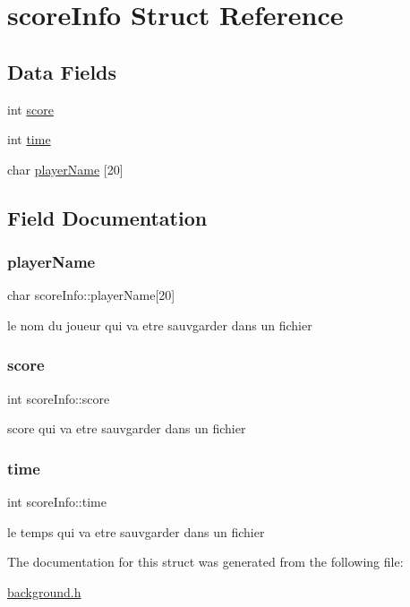 \hypertarget{structscoreInfo}{}\section{score\+Info Struct Reference}
\label{structscoreInfo}
\subsection*{Data Fields}
\begin{DoxyCompactItemize}
\item 
int \hyperlink{structscoreInfo_a069de30b9e77b3e70ac41fa540de597f}{score}
\item 
int \hyperlink{structscoreInfo_afde9e8d931cc432c5b864f51060bd6e1}{time}
\item 
char \hyperlink{structscoreInfo_aaadcff60b4fd792feccd1113eb0c6f98}{player\+Name} \mbox{[}20\mbox{]}
\end{DoxyCompactItemize}


\subsection{Field Documentation}
\mbox{\label{structscoreInfo_aaadcff60b4fd792feccd1113eb0c6f98}} 
\subsubsection{\texorpdfstring{player\+Name}{playerName}}
{\footnotesize\ttfamily char score\+Info\+::player\+Name\mbox{[}20\mbox{]}}

le nom du joueur qui va etre sauvgarder dans un fichier \mbox{\label{structscoreInfo_a069de30b9e77b3e70ac41fa540de597f}} 
\subsubsection{\texorpdfstring{score}{score}}
{\footnotesize\ttfamily int score\+Info\+::score}

score qui va etre sauvgarder dans un fichier \mbox{\label{structscoreInfo_afde9e8d931cc432c5b864f51060bd6e1}} 
\subsubsection{\texorpdfstring{time}{time}}
{\footnotesize\ttfamily int score\+Info\+::time}

le temps qui va etre sauvgarder dans un fichier 

The documentation for this struct was generated from the following file\+:\begin{DoxyCompactItemize}
\item 
\hyperlink{background_8h}{background.\+h}\end{DoxyCompactItemize}
